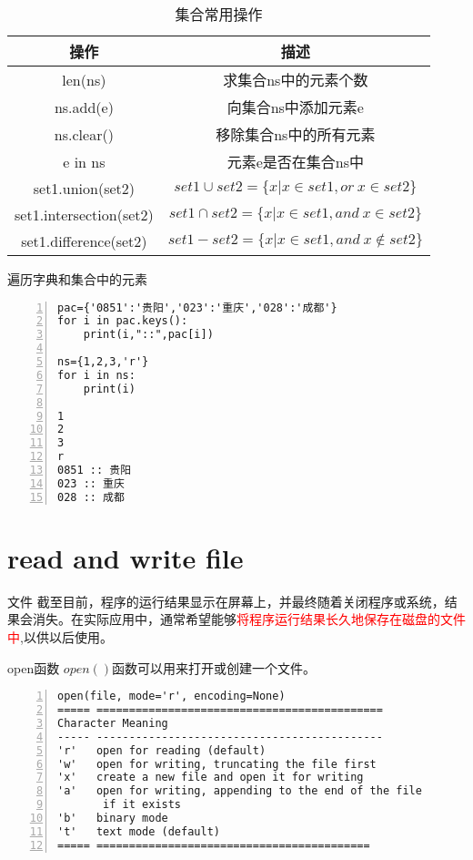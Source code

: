 \documentclass{beamer}
\begin{document}
\begin{frame}
\begin{table}[htp]
\caption{集合常用操作}
\begin{center}
\begin{tabular}{cc}
\toprule
\textbf{操作}&\textbf{描述}\\
\midrule
len(ns)&求集合ns中的元素个数\\
ns.add(e)&向集合ns中添加元素e\\
ns.clear()&移除集合ns中的所有元素\\
e in ns&元素e是否在集合ns中\\
set1.union(set2)&$set1\cup set2=\{x|x\in set1,or\ x\in set2\}$\\
set1.intersection(set2)&$set1\cap set2=\{x|x\in set1,and\  x\in set2\}$\\
set1.difference(set2)&$set1-set2=\{x|x\in set1,and\  x\notin set2\}$\\
\bottomrule
\end{tabular}
\end{center}
\label{dict}
\end{table}%
\end{frame}
\begin{frame}[fragile]{遍历字典和集合中的元素}
\begin{Verbatim}[numbers=left,frame=single,rulecolor=\color{red}]
pac={'0851':'贵阳','023':'重庆','028':'成都'}
for i in pac.keys():
    print(i,"::",pac[i])
    
ns={1,2,3,'r'}
for i in ns:
    print(i)

1
2
3
r
0851 :: 贵阳
023 :: 重庆
028 :: 成都
\end{Verbatim}
\end{frame}

\section{read and write file}
\begin{frame}{文件}
截至目前，程序的运行结果显示在屏幕上，并最终随着关闭程序或系统，结果会消失。在实际应用中，通常希望能够\textcolor{red}{将程序运行结果长久地保存在磁盘的文件中},以供以后使用。
\end{frame}
\begin{frame}[fragile]{open函数}
$open()$函数可以用来打开或创建一个文件。
\small{
\begin{Verbatim}[numbers=left,frame=single,rulecolor=\color{red}]
open(file, mode='r', encoding=None)
===== ============================================
Character Meaning
----- --------------------------------------------
'r'   open for reading (default)
'w'   open for writing, truncating the file first
'x'   create a new file and open it for writing
'a'   open for writing, appending to the end of the file
       if it exists
'b'   binary mode
't'   text mode (default)
===== ==========================================
\end{Verbatim}
}
\end{frame}
\end{document}
